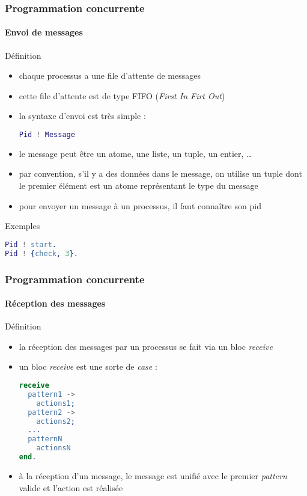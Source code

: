 \begin{frame}[fragile]
  \frametitle{Programmation concurrente}
  \framesubtitle{Envoi de messages}

  \begin{block}{Définition}
    \begin{itemize}
    \item chaque processus a une file d'attente de messages
    \item cette file d'attente est de type FIFO (\textit{First In Firt Out})
    \item la syntaxe d'envoi est très simple :
      \begin{lstlisting}[language=erlang]
Pid ! Message
      \end{lstlisting}
    \item le message peut être un atome, une liste, un tuple, un entier, \ldots
    \item par convention, s'il y a des données dans le message, on utilise
      un tuple dont le premier élément est un atome représentant le type
      du message
    \item pour envoyer un message à un processus, il faut connaître son pid
    \end{itemize}
  \end{block}

  \begin{exampleblock}{Exemples}
    \begin{lstlisting}[language=erlang]
Pid ! start.
Pid ! {check, 3}.
    \end{lstlisting}
  \end{exampleblock}

\end{frame}

\begin{frame}[fragile]
  \frametitle{Programmation concurrente}
  \framesubtitle{Réception des messages}

  \begin{block}{Définition}
    \begin{itemize}
    \item la réception des messages par un processus se fait via un bloc
      \textit{receive}
    \item un bloc \textit{receive} est une sorte de \textit{case} :
      \begin{lstlisting}[language=erlang]
receive
  pattern1 ->
    actions1;
  pattern2 ->
    actions2;
  ...
  patternN
    actionsN
end.
      \end{lstlisting}
    \item à la réception d'un message, le message est unifié avec le premier
      \textit{pattern} valide et l'action est réalisée
    \end{itemize}
  \end{block}

\end{frame}

